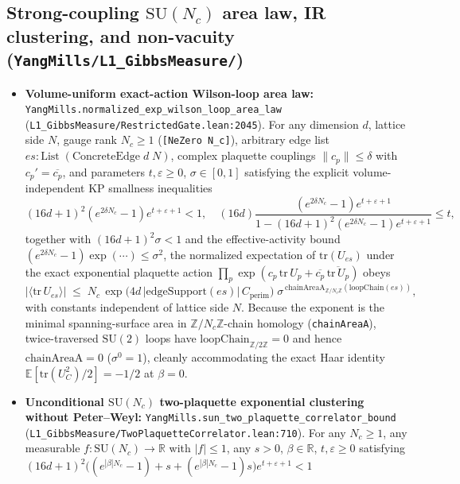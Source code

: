 \documentclass[11pt]{article}
\begin{document}
\subsection{Strong-coupling $\mathrm{SU}(N_c)$ area law, IR clustering, and non-vacuity (\texttt{YangMills/L1\_GibbsMeasure/})}
\begin{itemize}
  \item \textbf{Volume-uniform exact-action Wilson-loop area law:}
  \texttt{YangMills.normalized\_exp\_wilson\_loop\_area\_law}
  (\texttt{L1\_GibbsMeasure/RestrictedGate.lean:2045}). For any dimension $d$, lattice side
  $N$, gauge rank $N_c \ge 1$ (\texttt{[NeZero N\_c]}), arbitrary edge list
  $es : \mathrm{List}\;(\mathrm{ConcreteEdge}\;d\;N)$, complex plaquette couplings
  $\|c_p\| \le \delta$ with $c_p' = \overline{c_p}$, and parameters $t,\varepsilon \ge 0$,
  $\sigma \in [0,1]$ satisfying the explicit volume-independent KP smallness inequalities
  \[
    (16d+1)^2 (e^{2\delta N_c} - 1) e^{t+\varepsilon+1} < 1, \quad
    (16d)\frac{(e^{2\delta N_c}-1)e^{t+\varepsilon+1}}{1 - (16d+1)^2(e^{2\delta N_c}-1)e^{t+\varepsilon+1}} \le t,
  \]
  together with $(16d+1)^2 \sigma < 1$ and the effective-activity bound
  $(e^{2\delta N_c}-1)\exp(\cdots) \le \sigma^2$, the normalized expectation of
  $\mathrm{tr}(U_{es})$ under the exact exponential plaquette action
  $\prod_p \exp(c_p\,\mathrm{tr}\,U_p + \overline{c_p}\,\overline{\mathrm{tr}\,U_p})$
  obeys
  \[
    \bigl|\langle \mathrm{tr}\, U_{es}\rangle\bigr|
    \;\le\; N_c\, \exp\bigl(4d\,|\mathrm{edgeSupport}(es)|\,C_{\mathrm{perim}}\bigr)\;
    \sigma^{\,\mathrm{chainAreaA}_{\mathbb{Z}/N_c\mathbb{Z}}(\mathrm{loopChain}(es))},
  \]
  with constants independent of lattice side $N$. Because the exponent is the minimal
  spanning-surface area in $\mathbb{Z}/N_c\mathbb{Z}$-chain homology (\texttt{chainAreaA}),
  twice-traversed $\mathrm{SU}(2)$ loops have $\mathrm{loopChain}_{\mathbb{Z}/2\mathbb{Z}} = 0$
  and hence $\mathrm{chainAreaA} = 0$ ($\sigma^0 = 1$), cleanly accommodating the exact
  Haar identity $\mathbb{E}[\mathrm{tr}(U_C^2)/2] = -1/2$ at $\beta = 0$.
  \item \textbf{Unconditional $\mathrm{SU}(N_c)$ two-plaquette exponential clustering without Peter--Weyl:}
  \texttt{YangMills.sun\_two\_plaquette\_correlator\_bound}
  (\texttt{L1\_GibbsMeasure/TwoPlaquetteCorrelator.lean:710}). For any $N_c \ge 1$, any
  measurable $f : \mathrm{SU}(N_c) \to \mathbb{R}$ with $|f| \le 1$, any $s > 0$,
  $\beta \in \mathbb{R}$, $t,\varepsilon \ge 0$ satisfying
  $(16d+1)^2 \bigl((e^{|\beta| N_c}-1) + s + (e^{|\beta| N_c}-1)s\bigr) e^{t+\varepsilon+1} < 1$

\end{itemize}
\end{document}
